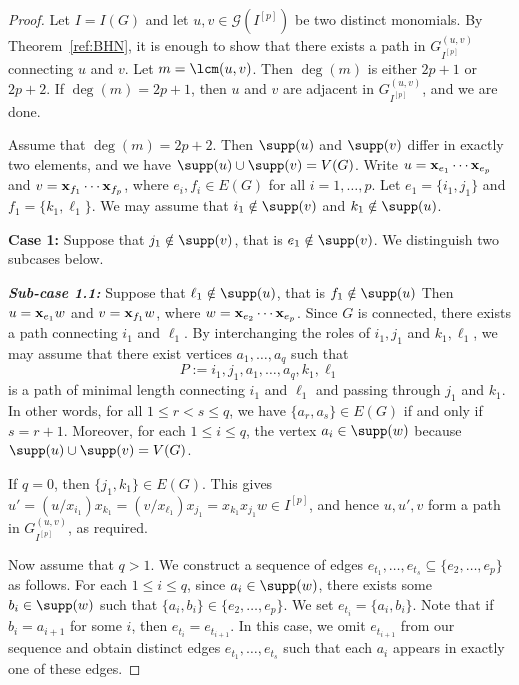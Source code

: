 \documentclass[12pt]{amsart}
\begin{document}
\begin{proof}
Let $I = I(G)$ and let $u, v \in \mathcal{G}(I^{[p]})$ be two distinct monomials. 
By Theorem~\ref{ref:BHN}, it is enough to show that there exists a path in $G^{(u,v)}_{I^{[p]}}$ connecting $u$ and $v$. 
Let $m = \lcm(u,v)$. 
Then $\deg(m)$ is either $2p + 1$ or $2p + 2$. 
If $\deg(m) = 2p + 1$, then $u$ and $v$ are adjacent in $G^{(u,v)}_{I^{[p]}}$, and we are done. 

Assume that $\deg(m) = 2p + 2$. 
Then $\supp(u)$ and $\supp(v)$ differ in exactly two elements, and we have $\supp(u) \cup \supp(v) = V(G)$. 
Write $u = {\bf x}_{e_1} \cdots {\bf x}_{e_p}$ and $v = {\bf x}_{f_1} \cdots {\bf x}_{f_p}$, where $e_i, f_i \in E(G)$ for all $i = 1, \ldots, p$. 
Let $e_1 = \{i_1, j_1\}$ and $f_1 = \{k_1, \ell_1\}$. 
We may assume that $i_1 \notin \supp(v)$ and $k_1 \notin \supp(u)$.

\medskip
\noindent
{\bf Case 1:} Suppose that $j_1 \notin \supp(v)$, that is $e_1 \notin  \supp(v)$. We distinguish two subcases below.
\vspace{0.2cm}


\noindent
\textit{\textbf{ Sub-case 1.1:}} Suppose that $\ell_1 \notin \supp(u)$, that is $f_1 \notin  \supp(u)$
Then $u = {\bf x}_{e_1} w$ and $v = {\bf x}_{f_1} w$, where $w = {\bf x}_{e_2} \cdots {\bf x}_{e_p}$. 
Since $G$ is connected, there exists a path connecting $i_1$ and $\ell_1$. 
By interchanging the roles of $i_1, j_1$ and $k_1, \ell_1$, we may assume that there exist vertices $a_1, \ldots, a_q$ such that 
\[
P := i_1, j_1, a_1, \ldots, a_q, k_1, \ell_1
\]
is a path of minimal length connecting $i_1$ and $\ell_1$ and passing through $j_1$ and $k_1$. 
In other words, for all $1 \le r < s \le q$, we have $\{a_r, a_s\} \in E(G)$ if and only if $s = r + 1$. 
Moreover, for each $1 \le i \le q$, the vertex $a_i \in \supp(w)$ because $\supp(u) \cup \supp(v) = V(G)$.

If $q = 0$, then $\{j_1, k_1\} \in E(G)$. 
This gives $u' = (u /x_{i_1} )x_{k_1} = (v /x_{\ell_1} )x_{j_1}=x_{k_1} x_{j_1} w \in I^{[p]}$, and hence $u, u', v$ form a path in $G_{I^{[p]}}^{(u,v)}$, as required. 

Now assume that $q > 1$. 
We construct a sequence of edges $e_{t_1}, \ldots, e_{t_s} \subseteq \{e_2, \ldots, e_p\}$ as follows. 
For each $1 \le i \le q$, since $a_i \in \supp(w)$, there exists some $b_i \in \supp(w)$ such that $\{a_i, b_i\} \in \{e_2, \ldots, e_p\}$. 
We set $e_{t_i} = \{a_i, b_i\}$. 
Note that if $b_i = a_{i+1}$ for some $i$, then $e_{t_i} = e_{t_{i+1}}$. 
In this case, we omit $e_{t_{i+1}}$ from our sequence and obtain distinct edges $e_{t_1}, \ldots, e_{t_s}$ such that each $a_i$ appears in exactly one of these edges. 


\end{proof}
\end{document}
